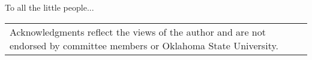 To all the little people...

\begin{table}[b]
\begin{tabular}{p{}}
Acknowledgments reflect the views of the author and are not endorsed by committee members or Oklahoma State University.
\end{tabular}
\end{table}
